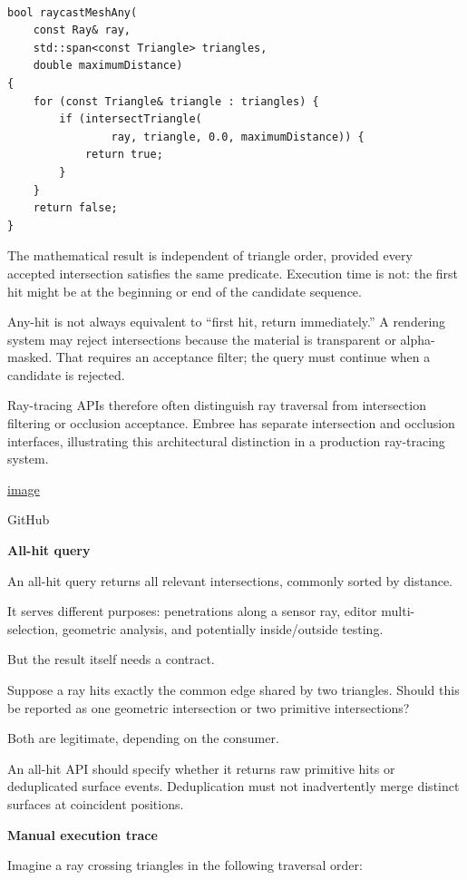 \begin{verbatim}

bool raycastMeshAny(
    const Ray& ray,
    std::span<const Triangle> triangles,
    double maximumDistance)
{
    for (const Triangle& triangle : triangles) {
        if (intersectTriangle(
                ray, triangle, 0.0, maximumDistance)) {
            return true;
        }
    }
    return false;
}
\end{verbatim}

The mathematical result is independent of triangle order, provided every accepted intersection satisfies the same predicate. Execution time is not: the first hit might be at the beginning or end of the candidate sequence.

Any-hit is not always equivalent to ``first hit, return immediately.'' A rendering system may reject intersections because the material is transparent or alpha-masked. That requires an acceptance filter; the query must continue when a candidate is rejected.

Ray-tracing APIs therefore often distinguish ray traversal from intersection filtering or occlusion acceptance. Embree has separate intersection and occlusion interfaces, illustrating this architectural distinction in a production ray-tracing system. 

\href{https://www.google.com/s2/favicons?domain=https://github.com&sz=32}{image}

GitHub

\textbf{All-hit query}

An all-hit query returns all relevant intersections, commonly sorted by distance.

It serves different purposes: penetrations along a sensor ray, editor multi-selection, geometric analysis, and potentially inside/outside testing.

But the result itself needs a contract.

Suppose a ray hits exactly the common edge shared by two triangles. Should this be reported as one geometric intersection or two primitive intersections?

Both are legitimate, depending on the consumer.

An all-hit API should specify whether it returns raw primitive hits or deduplicated surface events. Deduplication must not inadvertently merge distinct surfaces at coincident positions.

\textbf{Manual execution trace}

Imagine a ray crossing triangles in the following traversal order:


